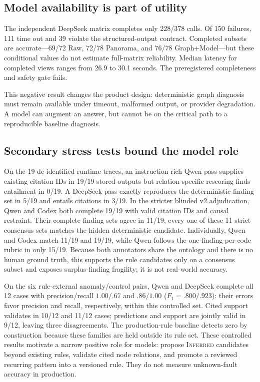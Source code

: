 \documentclass[runningheads]{llncs}
\newcommand{\inferred}{\textsc{Inferred}\xspace}
\begin{document}
\subsection{Model availability is part of utility}

The independent DeepSeek matrix completes only 228/378 calls.  Of 150 failures,
111 time out and 39 violate the structured-output contract.  Completed subsets
are accurate---69/72 Raw, 72/78 Panorama, and 76/78 Graph+Model---but these
conditional values do not estimate full-matrix reliability.  Median latency for
completed views ranges from 26.9 to 30.1 seconds.  The preregistered completeness
and safety gate fails.

This negative result changes the product design: deterministic graph diagnosis
must remain available under timeout, malformed output, or provider degradation.
A model can augment an answer, but cannot be on the critical path to a
reproducible baseline diagnosis.

\subsection{Secondary stress tests bound the model role}

On the 19 de-identified runtime traces, an instruction-rich Qwen pass supplies
existing citation IDs in 19/19 stored outputs but relation-specific rescoring
finds entailment in 0/19. A DeepSeek pass exactly reproduces the deterministic
finding set in 5/19 and entails citations in 3/19. In the stricter blinded v2
adjudication, Qwen and Codex both complete 19/19 with valid citation IDs and
causal restraint. Their complete finding sets agree in 11/19; every one of these
11 strict consensus sets matches the hidden deterministic candidate. Individually,
Qwen and Codex match 11/19 and 19/19, while Qwen follows the one-finding-per-code
rubric in only 15/19. Because both annotators share the ontology and there is no
human ground truth, this supports the rule candidates only on a consensus subset
and exposes surplus-finding fragility; it is not real-world accuracy.

On the six rule-external anomaly/control pairs, Qwen and DeepSeek complete all
12 cases with precision/recall $1.00/.67$ and $.86/1.00$ ($F_1=.800/.923$):
their errors favor precision and recall, respectively, within this controlled
set. Cited support validates in 10/12 and 11/12 cases; predictions and support
are jointly valid in 9/12, leaving three disagreements. The production-rule baseline detects zero by
construction because these families are held outside its rule set.  These
controlled results motivate a narrow positive role for models: propose
\inferred candidates beyond existing rules, validate cited node relations, and
promote a reviewed recurring pattern into a versioned rule.  They do not measure
unknown-fault accuracy in production.
\end{document}
